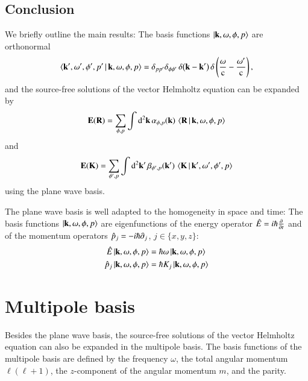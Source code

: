 \subsection{Conclusion}

We briefly outline the main results: The basis functions $\ket{{\mathbf{k}}, \omega,
\phi, p}$ are orthonormal
\begin{equation}
\braket{{\mathbf{k}}^\prime, \omega^\prime, \phi^\prime, p^\prime \, | \, {\mathbf{k}}, \omega, \phi, p} 
= \delta_{p p^\prime} \delta_{\phi \phi^\prime}\, \delta{\left({\mathbf{k}} - {\mathbf{k}}^\prime\right)} \, \delta\left(\frac{\omega}{\mathrm{c}}-\frac{\omega^\prime}{\mathrm{c}}\right) ,
\end{equation}
and the source-free solutions of the vector Helmholtz equation can be expanded by
\begin{equation}
{\mathbf{E}}({\mathbf{R}}) = \sum_{\phi,p} \int \mathrm{d}^2 {\mathbf{k}} \, \alpha_{\phi,p}({\mathbf{k}}) \, \braket{{\mathbf{R}} \, | \, {\mathbf{k}}, \omega, \phi, p}
\end{equation}
and
\begin{equation}
{\mathbf{E}}({\mathbf{K}}) = \sum_{\phi^\prime,p} \int \mathrm{d}^2 {\mathbf{k}}^\prime \, \beta_{\phi^\prime,p}({\mathbf{k}}^\prime) \, \braket{{\mathbf{K}} \, | \, {\mathbf{k^\prime}}, \omega^\prime, \phi^\prime, p}
\end{equation}
using the plane wave basis.

The plane wave basis is well adapted to the homogeneity in space and time:
The basis functions $\ket{{\mathbf{k}}, \omega, \phi, p}$
are eigenfunctions of the energy operator $\hat E = i\hbar\frac{\partial}{\partial t}$ and of the momentum
operators $\hat{p}_j = -i \hbar \partial_j$, $j\in\{x,y,z\}$:
\begin{align}
\hat{E}   \ket{{\mathbf{k}}, \omega, \phi, p} &= \hbar \omega \ket{{\mathbf{k}}, \omega, \phi, p} \\
\hat{p}_j \ket{{\mathbf{k}}, \omega, \phi, p} &= \hbar K_j    \ket{{\mathbf{k}}, \omega, \phi, p}
\end{align}


\section{Multipole basis}
\label{chapter_basis_multipol}

Besides the plane wave basis, the source-free solutions of the vector Helmholtz
equation can also be expanded in the multipole basis. The basis functions of
the multipole basis are defined by the frequency $\omega$, the total angular
momentum $\ell(\ell+1)$, the $z$-component of the angular momentum $m$, and the
parity.

